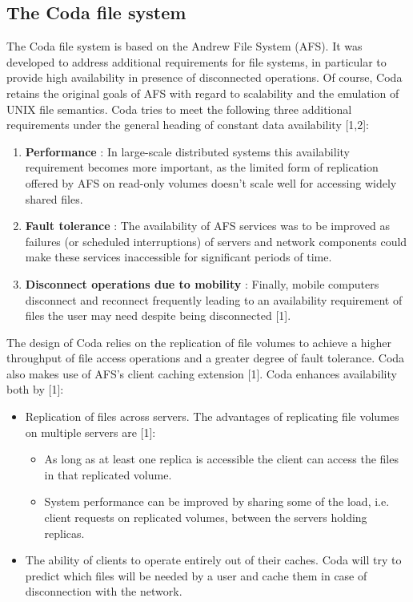 \subsection{The Coda file system}


The Coda file system is based on the Andrew File System (AFS). It was developed to address additional requirements for file systems, in particular to provide high availability in presence of disconnected operations. Of course, Coda retains the original goals of AFS with regard to scalability and the emulation of UNIX file semantics. Coda tries to meet the following three additional requirements under the general heading of constant data availability [1,2]:

\begin{enumerate}
	\item \textbf{Performance} : In large-scale distributed systems this availability requirement becomes more important, as the limited form of replication offered by AFS on read-only volumes doesn't scale well for accessing widely shared files.
	\item \textbf{Fault tolerance} : The availability of AFS services was to be improved as failures (or scheduled interruptions) of servers and network components could make these services inaccessible for significant periods of time.
	\item \textbf{Disconnect operations due to mobility} : Finally, mobile computers disconnect and reconnect frequently leading to an availability requirement of files the user may need despite being disconnected [1].
\end{enumerate}

The design of Coda relies on the replication of file volumes to achieve a higher throughput of file access operations and a greater degree of fault tolerance. Coda also makes use of AFS's client caching extension [1]. Coda enhances availability both by [1]:
\begin{itemize}
	\item Replication of files across servers. The advantages of replicating file volumes on multiple servers are [1]:
		\begin{itemize}
			\item As long as at least one replica is accessible the client can access the files in that replicated volume.
			\item System performance can be improved by sharing some of the load, i.e. client requests on replicated volumes, between the servers holding replicas.
		\end{itemize}
	
	\item The ability of clients to operate entirely out of their caches. Coda will try to predict which files will be needed by a user and cache them in case of disconnection with the network.
\end{itemize}



